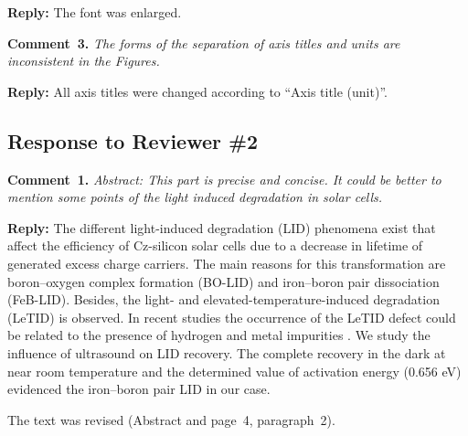 \documentclass[sn-mathphys]{sn-jnl}
\begin{document}
\noindent
\textcolor[rgb]{0.51,0.00,0.00}{\textbf{Reply:}}
The font was enlarged.

\vspace{1cm}
\noindent
\textcolor[rgb]{0.00,0.50,1.00}{\textbf{Comment~3.}}
\emph{The forms of the separation of axis titles and units are inconsistent in the Figures.}

\noindent
\textcolor[rgb]{0.51,0.00,0.00}{\textbf{Reply:}}
All axis titles were changed according to ``Axis title (unit)''.


\subsection*{Response to Reviewer \#2 }
\noindent
\textcolor[rgb]{0.00,0.50,1.00}{\textbf{Comment~1.}}
\emph{Abstract: This part is precise and concise.
It could be better to mention some points of the light induced degradation in solar cells.}

\noindent
\textcolor[rgb]{0.51,0.00,0.00}{\textbf{Reply:}}
The different light-induced degradation (LID) phenomena exist that affect the efficiency
of Cz-silicon solar cells due to a decrease in lifetime of generated excess charge carriers.
The main reasons for this transformation are boron--oxygen complex formation (BO-LID) \cite{LIDRev} and
iron--boron pair dissociation (FeB-LID).
Besides, the light- and elevated-temperature-induced degradation (LeTID) is observed.
In recent studies the occurrence of the LeTID defect could be related
to the presence of hydrogen and metal impurities \cite{LeTID_H,LeTID_Me,LeTID_Me2}.
We study the  influence of ultrasound on LID recovery.
The complete recovery in the dark at near room temperature and the determined value
of activation energy (0.656 eV) evidenced the iron--boron pair LID in our case.

The text was revised (Abstract and page~4, paragraph~2).

%
%
%
%
%
%
%
%
\end{document}
